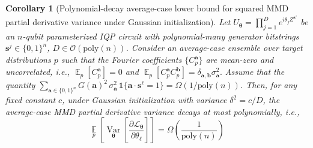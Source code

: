\documentclass[a4paper,onecolumn,notitlepage,nofootinbib,longbibliography,superscriptaddress, floatfix, pra, aps, 10pt]{revtex4-2}
\newcommand{\vttheta}{{\bm{\theta}}}
\newcommand{\vta}{{\bm{a}}}
\newcommand{\vtb}{{\bm{b}}}
\newcommand{\vtsj}{{\bm{s}^j}}
\newcommand{\vts}{{\bm{s}}}
\newtheorem{corollary}{Corollary}
\begin{document}
\begin{corollary}[Polynomial-decay average-case lower bound for squared MMD partial derivative variance under Gaussian initialization]
\label{cor:poly_lb_gaussian_mmd}
Let $U_\vttheta = \prod_{j=1}^D e^{i \theta_j Z^\vtsj}$ be an $n$-qubit parameterized IQP circuit with polynomial-many generator
bitstrings $\vtsj \in \{0,1\}^n$, $D \in \mathcal{O}(\text{poly}(n))$. Consider an average-case ensemble over target distributions $p$ such that the Fourier coefficients $\{C^\vta_p\}$ are mean-zero and uncorrelated, i.e.,
$\operatorname*{\mathbb{E}}_p \left[ C^\vta_p\right] = 0$ and $\operatorname*{\mathbb{E}}_p \left[ C^\vta_p C^\vtb_p\right] = \delta_{\vta,\vtb} \sigma_\vta^2.$ Assume that the quantity $\sum_{\vta\in\{0,1\}^n} G(\vta)^2\,\sigma_\vta^2\,\mathds{1}\{\vta\cdot\vts^\ell=1\} = \Omega(1/\text{poly}(n))$. Then, for any fixed constant $c$, under Gaussian initialization with variance $\delta^2 = c/D$, the average-case MMD partial derivative variance decays at most polynomially, i.e.,
\begin{equation}
\operatorname*{\mathbb{E}}_p\left[\operatorname*{Var}_{\vttheta} \left[ \frac{\partial \mathcal{L}_\vttheta}{\partial \theta_\ell} \right]\right] = \Omega(\frac{1}{\text{poly}(n)})
\end{equation}
\end{corollary}
\end{document}
